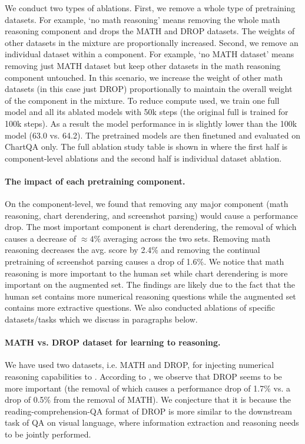 We conduct two types of ablations. First, we remove a whole type of pretraining datasets. For example, `no math reasoning' means removing the whole math reasoning component and drops the MATH and DROP datasets. The weights of other datasets in the mixture are proportionally increased. Second, we remove an individual dataset within a component. For example, `no MATH dataset' means removing just MATH dataset but keep other datasets in the math reasoning component untouched. In this scenario, we increase the weight of other math datasets (in this case just DROP) proportionally to maintain the overall weight of the component in the mixture. To reduce compute used, we train one full \model{} model and all its ablated models with 50k steps (the original full \model{} is trained for 100k steps). As a result the \model{} model performance in  is slightly lower than the 100k model (63.0 vs. 64.2). The pretrained models are then finetuned and evaluated on ChartQA only.
The full ablation study table is shown in  where the first half is component-level ablations and the second half is individual dataset ablation.

\paragraph{The impact of each pretraining component.} On the component-level, we found that removing any major component (math reasoning, chart derendering, and screenshot parsing) would cause a performance drop. The most important component is chart derendering, the removal of which causes a decrease of $\approx 4\%$ averaging across the two sets. Removing math reasoning decreases the avg. score by 2.4\% and removing the continual pretraining of screenshot parsing causes a drop of 1.6\%. We notice that math reasoning is more important to the human set while chart derendering is more important on the augmented set. The findings are likely due to the fact that the human set contains more numerical reasoning questions while the augmented set contains more extractive questions. We also conducted ablations of specific datasets/tasks which we discuss in paragraphs below.


\paragraph{MATH vs. DROP dataset for learning to reasoning.} We have used two datasets, i.e. MATH and DROP, for injecting numerical reasoning capabilities to \model{}. According to , we observe that DROP seems to be more important (the removal of which causes a performance drop of 1.7\% vs. a drop of 0.5\% from the removal of MATH). We conjecture that it is because the reading-comprehension-QA format of DROP is more similar to the downstream task of QA on visual language, where information extraction and reasoning needs to be jointly performed.

